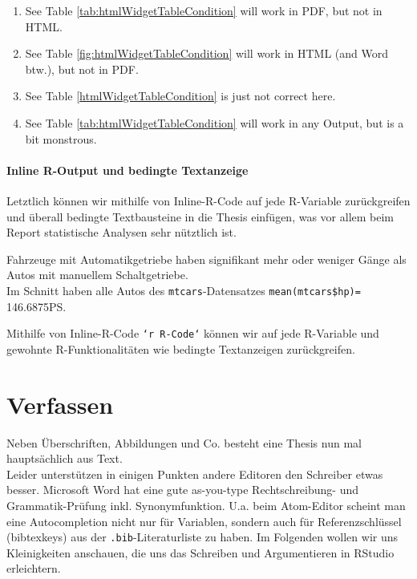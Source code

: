 \documentclass[]{book}
\makeatletter
\newenvironment{Shaded}{\begin{snugshade}}{\end{snugshade}}
\newcommand{\BaseNTok}[1]{\textcolor[rgb]{0.00,0.00,0.81}{{#1}}}
\newcommand{\NormalTok}[1]{{#1}}
\providecommand{\tightlist}{%
  \setlength{\itemsep}{0pt}\setlength{\parskip}{0pt}}
\newenvironment{kframe}{%
\medskip{}
\setlength{\fboxsep}{.8em}
 \def\at@end@of@kframe{}%
 \ifinner\ifhmode%
  \def\at@end@of@kframe{\end{minipage}}%
  \begin{minipage}{\columnwidth}%
 \fi\fi%
 \def\FrameCommand##1{\hskip\@totalleftmargin \hskip-\fboxsep
 \colorbox{shadecolor}{##1}\hskip-\fboxsep
     \hskip-\linewidth \hskip-\@totalleftmargin \hskip\columnwidth}%
 \MakeFramed {\advance\hsize-\width
   \@totalleftmargin\z@ \linewidth\hsize
   \@setminipage}}%
 {\par\unskip\endMakeFramed%
 \at@end@of@kframe}
\renewenvironment{Shaded}{\begin{kframe}}{\end{kframe}}
\theoremstyle{definition}
\theoremstyle{definition}
\theoremstyle{remark}
\let\BeginKnitrBlock\begin \let\EndKnitrBlock\end
\makeatother
\begin{document}
\begin{enumerate}
\def\labelenumi{\arabic{enumi}.}
\tightlist
\item
  See Table \ref{tab:htmlWidgetTableCondition} will work in PDF, but not
  in HTML.
\item
  See Table \ref{fig:htmlWidgetTableCondition} will work in HTML (and
  Word btw.), but not in PDF.
\item
  See Table \ref{htmlWidgetTableCondition} is just not correct here.
\item
  See Table \ref{tab:htmlWidgetTableCondition} will work in any Output,
  but is a bit monstrous.
\end{enumerate}

\subsubsection{Inline R-Output und bedingte
Textanzeige}\label{inline-r-output-und-bedingte-textanzeige}

Letztlich können wir mithilfe von Inline-R-Code auf jede R-Variable
zurückgreifen und überall bedingte Textbausteine in die Thesis einfügen,
was vor allem beim Report statistische Analysen sehr nütztlich ist.

\begin{Shaded}
\end{Shaded}

Fahrzeuge mit Automatikgetriebe haben signifikant mehr oder weniger
Gänge als Autos mit manuellem Schaltgetriebe.\\
Im Schnitt haben alle Autos des \texttt{mtcars}-Datensatzes
\texttt{mean(mtcars\$hp)=} 146.6875PS.

\BeginKnitrBlock{rmdimportant}
Mithilfe von Inline-R-Code \texttt{`r\ R-Code`} können wir auf jede
R-Variable und gewohnte R-Funktionalitäten wie bedingte Textanzeigen
zurückgreifen.
\EndKnitrBlock{rmdimportant}

\chapter{Verfassen}\label{verfassen}

Neben Überschriften, Abbildungen und Co. besteht eine Thesis nun mal
hauptsächlich aus Text.\\
Leider unterstützen in einigen Punkten andere Editoren den Schreiber
etwas besser. Microsoft Word hat eine gute as-you-type Rechtschreibung-
und Grammatik-Prüfung inkl. Synonymfunktion. U.a. beim Atom-Editor
scheint man eine Autocompletion nicht nur für Variablen, sondern auch
für Referenzschlüssel (bibtexkeys) aus der \texttt{.bib}-Literaturliste
zu haben. Im Folgenden wollen wir uns Kleinigkeiten anschauen, die uns
das Schreiben und Argumentieren in RStudio erleichtern.
\end{document}
